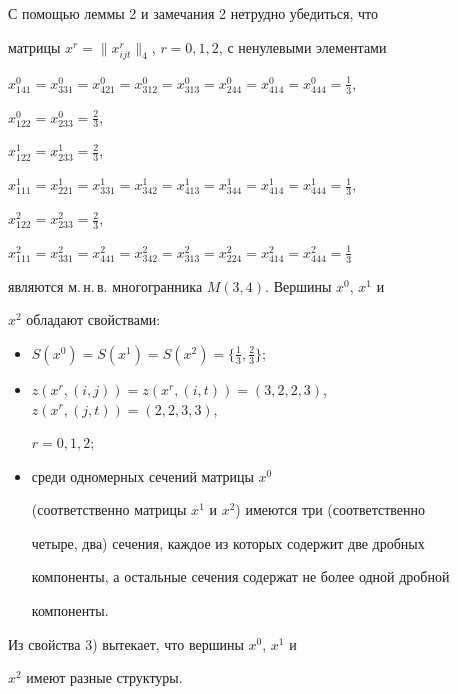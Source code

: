 \begin{exam}


С помощью леммы 2 и замечания 2 нетрудно убедиться, что


матрицы $x^r=\|x_{ijt}^r\|_4$, $r=0,1,2$, с ненулевыми элементами


$x_{141}^0=x_{331}^0=x_{421}^0=x_{312}^0=x_{313}^0=x_{244}^0=


x_{414}^0=x_{444}^0=\frac{1}{3}$,


$x_{122}^0=x_{233}^0=\frac{2}{3}$,


$x_{122}^1=x_{233}^1=\frac{2}{3}$,


$x_{111}^1=x_{221}^1=x_{331}^1=x_{342}^1=x_{413}^1=x_{344}^1=


x_{414}^1=x_{444}^1=\frac{1}{3}$,


$x_{122}^2=x_{233}^2=\frac{2}{3}$,


$x_{111}^2=x_{331}^2=x_{441}^2=x_{342}^2=x_{313}^2=x_{224}^2=


x_{414}^2=x_{444}^2=\frac{1}{3}$


являются м.\,н.\,в. многогранника $M(3,4)$. Вершины $x^0$, $x^1$ и


$x^2$ обладают свойствами:


\begin{itemize}


\item[1)] $S(x^0)=S(x^1)=S(x^2)=


\{\frac{1}{3},\frac{2}{3}\}$;


\item[2)] $z(x^r,(i,j))=z(x^r,(i,t))=(3,2,2,3)$, $z(x^r,(j,t))=(2,2,3,3)$,


$r=0,1,2$;


\item[3)] среди одномерных сечений матрицы $x^0$


(соответственно матрицы $x^1$ и $x^2$) имеются три (соответственно


четыре, два) сечения, каждое из которых содержит две дробных


компоненты, а остальные сечения содержат не более одной дробной


компоненты.


\end{itemize}





Из свойства 3) вытекает, что вершины $x^0$, $x^1$ и


$x^2$ имеют разные структуры.


\end{exam}






